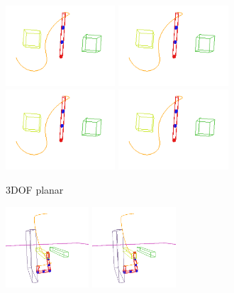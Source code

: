 \documentclass[letterpaper, 10 pt, conference]{ieeeconf}  %
\begin{document}
\begin{figure}[t!]
	\centering
	\begin{subfigure}[b]{\textwidth}
	    \centering
		\includegraphics[height=3cm]{fig/planning_efficiency/3dof_example}
		\includegraphics[height=3cm]{fig/planning_efficiency/3dof_example}
		\includegraphics[height=3cm]{fig/planning_efficiency/3dof_example}
		\includegraphics[height=3cm]{fig/planning_efficiency/3dof_example}
		\caption{3DOF planar}
		\label{fig:planning_efficiency:3dof:example}
	\end{subfigure}
	\begin{subfigure}[b]{\textwidth}
	    \centering
		\includegraphics[height=3cm]{fig/planning_efficiency/6dof_example}
		\includegraphics[height=3cm]{fig/planning_efficiency/6dof_example}

\end{subfigure}
\end{figure}
\end{document}
